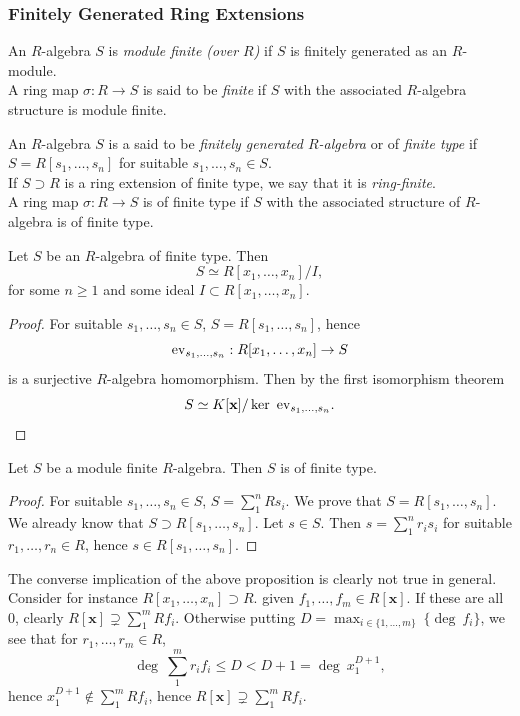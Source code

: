 \subsubsection{Finitely Generated Ring Extensions}
\begin{definition}
    An $R$-algebra $S$ is \emph{module finite (over $R$)} 
    if $S$ is finitely generated as an $R$-module.\\
    A ring map $\sigma : R \rightarrow S$ is said to be \emph{finite} if $S$ with the associated $R$-algebra structure is module finite. 
\end{definition}
\begin{definition}
    An $R$-algebra $S$ is a said to be \textit{finitely generated $R$-algebra} or of \emph{finite type} if $S=R[s_1,\dots,s_n]$ for suitable $s_1,\dots,s_n\in S$.\\ 
    If $S\supset R$ is a ring extension of finite type, we say that it is \textit{ring-finite}.\\
    A ring map $\sigma : R \rightarrow S$ is of finite type if $S$ with the associated structure of $R$-algebra is of finite type.  
\end{definition}
\begin{proposition}\label{FinitelyGeneratedAlgebrasArePolynomialQuotientRings}
    Let $S$ be an $R$-algebra of finite type. Then
    $$S\simeq R[x_1,\dots,x_n]/I,$$
    for some $n\geq 1$ and some ideal $I\subset R[x_1,\dots,x_n]$.
\end{proposition}
\begin{proof}
    For suitable $s_1,\dots,s_n\in S$, $S=R[s_1,\dots,s_n]$, hence 
    $$
        \mathrm{ev}_{s_1,\dots,s_n} : R[x_1,\dots,x_n]\rightarrow S
    $$ 
    is a surjective $R$-algebra homomorphism. Then by the first isomorphism theorem 
    $$
        S\simeq K[\mathbf{x}]/\ker \ \ev_{s_1,\dots,s_n}.
    $$ 
\end{proof}
\begin{proposition}\label{ModuleFiniteImpliesRingFinite}
    Let $S$ be a module finite $R$-algebra. Then $S$ is of finite type.
\end{proposition}
\begin{proof}
    For suitable $s_1,\dots,s_n\in S$, $S = \sum_1^n Rs_i$. We prove that $S = R[s_1,\dots,s_n]$. We already know that $S\supset R[s_1,\dots,s_n]$. Let $s\in S$. Then $s = \sum_1^n r_is_i$ for suitable $r_1,\dots,r_n \in R$, hence $s\in R[s_1,\dots,s_n]$. 
\end{proof}
\begin{example}
    The converse implication of the above proposition is clearly not true in general. Consider for instance $R[x_1,\dots,x_n]\supset R$. given $f_1,\dots,f_m\in R[\mathbf{x}]$. If these are all $0$, clearly $R[\mathbf{x}]\supsetneq \sum_1^m Rf_i$. Otherwise putting $D = \max_{i\in\{1,\dots,m\}}\ \{\deg\ f_i \}$, we see that for $r_1,\dots, r_m\in R$, 
    $$\deg \ \sum_1^m r_if_i \leq D < D+1 = \deg \ x_1^{D+1},$$
    hence $x_1^{D+1}\notin \sum_1^m Rf_i$, hence $R[\mathbf{x}]\supsetneq \sum_1^m Rf_i.$
\end{example}

